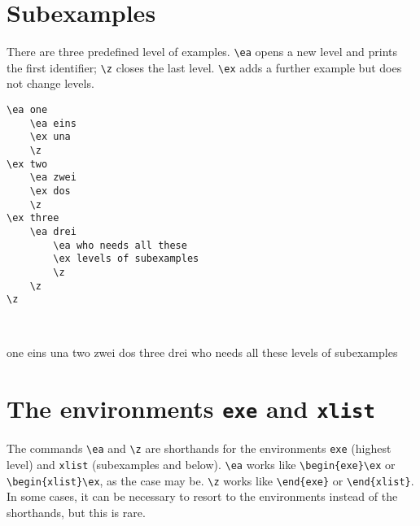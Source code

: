 \documentclass[output=paper]{langscibook}
\newcommand{\cmd}[1]{\texttt{\textbackslash#1}}
\newcommand{\env}[1]{\texttt{#1}}
\begin{document}
\section{Subexamples}
There are three predefined level of examples. \cmd{ea} opens a new level and prints the first identifier; \cmd{z} closes the last level. \cmd{ex} adds a further example but does not change levels.

\begin{minipage}[t]{.5\textwidth}
\begin{lstlisting}
\ea one
    \ea eins
    \ex una
    \z
\ex two
    \ea zwei
    \ex dos
    \z
\ex three
    \ea drei
        \ea who needs all these
        \ex levels of subexamples
        \z
    \z
\z
 \end{lstlisting}
\end{minipage}~
\parbox[t]{.45\textwidth}{
\ea one
    \ea eins
    \ex una
    \z
\ex two
    \ea zwei
    \ex dos
    \z
\ex three
    \ea drei
        \ea who needs all these
        \ex levels of subexamples
        \z
    \z
\z
}

\section{The environments \texttt{exe} and \texttt{xlist}}
The commands \cmd{ea} and \cmd{z} are shorthands for the environments \env{exe} (highest level) and \env{xlist} (subexamples and below). \cmd{ea} works like \verb+\begin{exe}\ex+ or \verb+\begin{xlist}\ex+, as the case may be. \cmd{z} works like \verb+\end{exe}+ or \verb+\end{xlist}+. In some cases, it can be necessary to resort to the environments instead of the shorthands, but this is rare.
\end{document}
